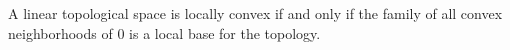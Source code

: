 A linear topological space is locally convex if and only if the family of all convex neighborhoods of $0$ is a local base for the topology.

